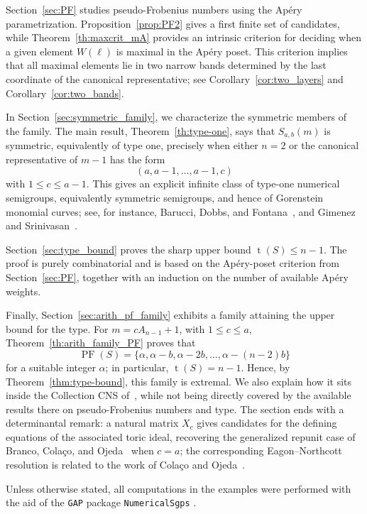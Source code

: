\documentclass[12pt,a4paper]{amsart}
\theoremstyle{definition}
\begin{document}
Section~\ref{sec:PF} studies pseudo-Frobenius numbers using the Ap\'ery parametrization. Proposition~\ref{prop:PF2} gives a first finite set of candidates, while Theorem~\ref{th:maxcrit_mA} provides an intrinsic criterion for deciding when a given element $W(\ell)$ is maximal in the Ap\'ery poset. This criterion implies that all maximal elements lie in two narrow bands determined by the last coordinate of the canonical representative; see Corollary~\ref{cor:two_layers} and Corollary~\ref{cor:two_bands}.

In Section~\ref{sec:symmetric_family}, we characterize the symmetric members of the family. The main result, Theorem~\ref{th:type-one}, says that $S_{a,b}(m)$ is symmetric, equivalently of type one, precisely when either $n=2$ or the canonical representative of $m-1$ has the form
\[
(a,a-1,\ldots,a-1,c)
\]
with $1\le c\le a-1$. This gives an explicit infinite class of type-one numerical semigroups, equivalently symmetric semigroups, and hence of Gorenstein monomial curves; see, for instance, Barucci, Dobbs, and Fontana~\cite{BDF97}, and Gimenez and Srinivasan~\cite{GimenezSrinivasan14}.

Section~\ref{sec:type_bound} proves the sharp upper bound $\operatorname{t}(S)\le n-1$. The proof is purely combinatorial and is based on the Ap\'ery-poset criterion from Section~\ref{sec:PF}, together with an induction on the number of available Ap\'ery weights.

Finally, Section~\ref{sec:arith_pf_family} exhibits a family attaining the upper bound for the type. For $m=cA_{n-1}+1$, with $1\le c\le a$, Theorem~\ref{th:arith_family_PF} proves that
\[
\operatorname{PF}(S)=\{\alpha,\alpha-b,\alpha-2b,\ldots,\alpha-(n-2)b\}
\]
for a suitable integer $\alpha$; in particular, $\operatorname{t}(S)=n-1$. Hence, by Theorem~\ref{thm:type-bound}, this family is extremal. We also explain how it sits inside the Collection CNS of~\cite{XIN}, while not being directly covered by the available results there on pseudo-Frobenius numbers and type. The section ends with a determinantal remark: a natural matrix $X_c$ gives candidates for the defining equations of the associated toric ideal, recovering the generalized repunit case of Branco, Cola\c{c}o, and Ojeda~\cite{BrancoColacoOjeda21} when $c=a$; the corresponding Eagon--Northcott resolution is related to the work of Cola\c{c}o and Ojeda~\cite{ColacoOjeda25}.

Unless otherwise stated, all computations in the examples were performed with the aid of the \texttt{GAP} \cite{GAP} package \texttt{NumericalSgps} \cite{numericalsgps}.
\end{document}
